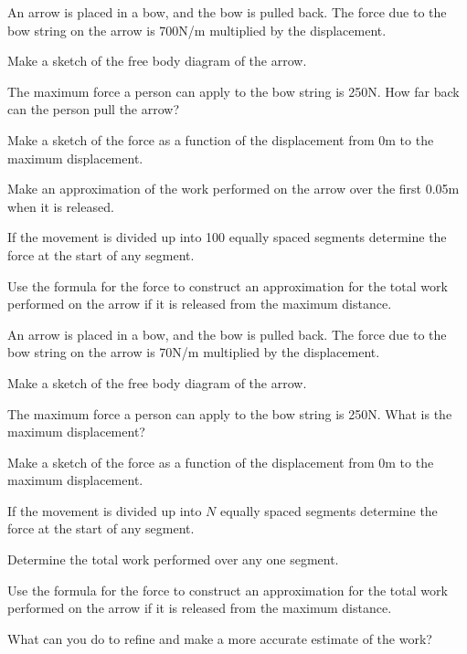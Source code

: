 \begin{problem}
\item An arrow is placed in a bow, and the bow is pulled back. The
  force due to the bow string on the arrow is 700N/m multiplied by the
  displacement. 
  \begin{subproblem}
  \item Make a sketch of the free body diagram of the arrow.
    \vfill
  \item The maximum force a person can apply to the bow string is
    250N. How far back can the person pull the arrow?
    \vfill
  \item Make a sketch of the force as a function of the displacement
    from 0m to the maximum displacement.
    \vfill
    \clearpage
  \item Make an approximation of the work performed on the arrow over
    the first 0.05m when it is released.
    \vfill
  \item If the movement is divided up into 100 equally spaced segments
    determine the force at the start of any segment.
    \vfill
  \item Use the formula for the force to construct an approximation
    for the total work performed on the arrow if it is released from
    the maximum distance.
    \vfill
  \end{subproblem}
\end{problem}

\begin{problem}
\item An arrow is placed in a bow, and the bow is pulled back. The
  force due to the bow string on the arrow is 70N/m multiplied by the
  displacement. 
  \begin{subproblem}
  \item Make a sketch of the free body diagram of the arrow.
      \vfill
  \item The maximum force a person can apply to the bow string is
    250N. What is the maximum displacement?  
    \vfill
  \item Make a sketch of the force as a function of the displacement
    from 0m to the maximum displacement.
    \vfill
    \clearpage
  \item If the movement is divided up into $N$ equally spaced segments
    determine the force at the start of any segment.
    \vfill
  \item Determine the total work performed over any one segment.
    \vfill
  \item Use the formula for the force to construct an approximation
    for the total work performed on the arrow if it is released from
    the maximum distance.
    \vfill
  \item What can you do to refine and make a more accurate estimate of
    the work?
  \end{subproblem}
\end{problem}

